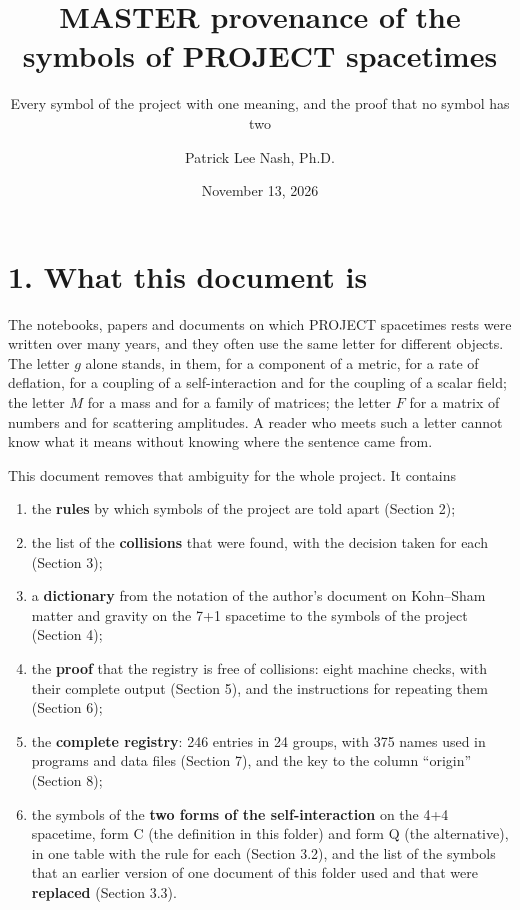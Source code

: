 \documentclass[
  10pt,
]{article}
\title{MASTER provenance of the symbols of PROJECT spacetimes}
\subtitle{Every symbol of the project with one meaning, and the proof
that no symbol has two}
\author{Patrick Lee Nash, Ph.D.}
\date{November 13, 2026}
\providecommand{\tightlist}{%
  \setlength{\itemsep}{0pt}\setlength{\parskip}{0pt}}
\begin{document}
\maketitle

\hypertarget{what-this-document-is}{%
\section{1. What this document is}\label{what-this-document-is}}

The notebooks, papers and documents on which PROJECT spacetimes rests
were written over many years, and they often use the same letter for
different objects. The letter \(g\) alone stands, in them, for a
component of a metric, for a rate of deflation, for a coupling of a
self-interaction and for the coupling of a scalar field; the letter
\(M\) for a mass and for a family of matrices; the letter \(F\) for a
matrix of numbers and for scattering amplitudes. A reader who meets such
a letter cannot know what it means without knowing where the sentence
came from.

This document removes that ambiguity for the whole project. It contains

\begin{enumerate}
\def\labelenumi{\arabic{enumi}.}
\tightlist
\item
  the \textbf{rules} by which symbols of the project are told apart
  (Section 2);
\item
  the list of the \textbf{collisions} that were found, with the decision
  taken for each (Section 3);
\item
  a \textbf{dictionary} from the notation of the author's document on
  Kohn--Sham matter and gravity on the 7+1 spacetime to the symbols of
  the project (Section 4);
\item
  the \textbf{proof} that the registry is free of collisions: eight
  machine checks, with their complete output (Section 5), and the
  instructions for repeating them (Section 6);
\item
  the \textbf{complete registry}: 246 entries in 24 groups, with 375
  names used in programs and data files (Section 7), and the key to the
  column ``origin'' (Section 8);
\item
  the symbols of the \textbf{two forms of the self-interaction} on the
  4+4 spacetime, form C (the definition in this folder) and form Q (the
  alternative), in one table with the rule for each (Section 3.2), and
  the list of the symbols that an earlier version of one document of
  this folder used and that were \textbf{replaced} (Section 3.3).
\end{enumerate}
\end{document}
